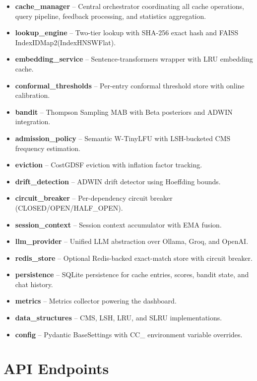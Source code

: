 \documentclass[12pt,a4paper]{report}
\begin{document}
\begin{itemize}[leftmargin=2cm]
\item \textbf{cache\_manager} -- Central orchestrator coordinating all cache operations, query pipeline, feedback processing, and statistics aggregation.
\item \textbf{lookup\_engine} -- Two-tier lookup with SHA-256 exact hash and FAISS IndexIDMap2(IndexHNSWFlat).
\item \textbf{embedding\_service} -- Sentence-transformers wrapper with LRU embedding cache.
\item \textbf{conformal\_thresholds} -- Per-entry conformal threshold store with online calibration.
\item \textbf{bandit} -- Thompson Sampling MAB with Beta posteriors and ADWIN integration.
\item \textbf{admission\_policy} -- Semantic W-TinyLFU with LSH-bucketed CMS frequency estimation.
\item \textbf{eviction} -- CostGDSF eviction with inflation factor tracking.
\item \textbf{drift\_detection} -- ADWIN drift detector using Hoeffding bounds.
\item \textbf{circuit\_breaker} -- Per-dependency circuit breaker (CLOSED/OPEN/HALF\_OPEN).
\item \textbf{session\_context} -- Session context accumulator with EMA fusion.
\item \textbf{llm\_provider} -- Unified LLM abstraction over Ollama, Groq, and OpenAI.
\item \textbf{redis\_store} -- Optional Redis-backed exact-match store with circuit breaker.
\item \textbf{persistence} -- SQLite persistence for cache entries, scores, bandit state, and chat history.
\item \textbf{metrics} -- Metrics collector powering the dashboard.
\item \textbf{data\_structures} -- CMS, LSH, LRU, and SLRU implementations.
\item \textbf{config} -- Pydantic BaseSettings with CC\_ environment variable overrides.
\end{itemize}

\section{API Endpoints}
\end{document}
